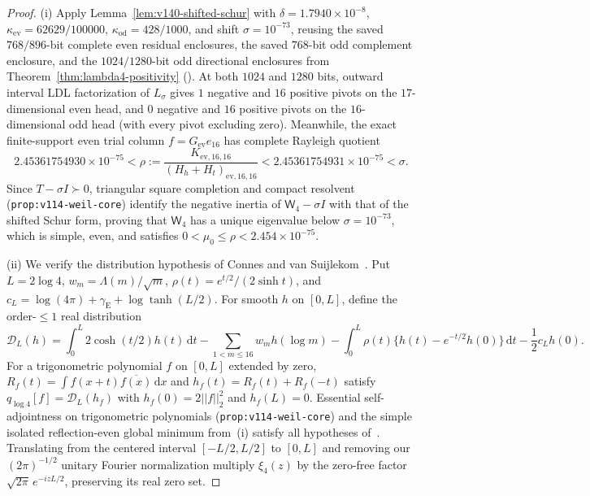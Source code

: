\documentclass[11pt]{article}
\def\norm#1{||#1||}%
\theoremstyle{remark}
\newcommand{\norm}[1]{\left\lVert #1\right\rVert}
\newcommand{\dd}{\mathrm d}
\begin{document}
\begin{proof}
(i) Apply Lemma~\ref{lem:v140-shifted-schur} with $\delta = 1.7940 \times 10^{-8}$, $\kappa_{\mathrm{ev}} = 62629/100000$, $\kappa_{\mathrm{od}} = 428/1000$, and shift $\sigma = 10^{-73}$, reusing the saved $768/896$-bit complete even residual enclosures, the saved $768$-bit odd complement enclosure, and the $1024/1280$-bit odd directional enclosures from Theorem~\ref{thm:lambda4-positivity} (). At both $1024$ and $1280$ bits, outward interval LDL factorization of $L_\sigma$ gives $1$ negative and $16$ positive pivots on the $17$-dimensional even head, and $0$ negative and $16$ positive pivots on the $16$-dimensional odd head (with every pivot excluding zero). Meanwhile, the exact finite-support even trial column $f = G_{\mathrm{ev}} e_{16}$ has complete Rayleigh quotient
\begin{equation}\label{eq:v140-rayleigh-e16}
  2.45361754930 \times 10^{-75} < \rho := \frac{K_{\mathrm{ev},16,16}}{(H_h + H_t)_{\mathrm{ev},16,16}} < 2.45361754931 \times 10^{-75} < \sigma.
\end{equation}
Since $T - \sigma I \succ 0$, triangular square completion and compact resolvent (\texttt{prop:v114-weil-core}) identify the negative inertia of $\mathsf{W}_4 - \sigma I$ with that of the shifted Schur form, proving that $\mathsf{W}_4$ has a unique eigenvalue below $\sigma = 10^{-73}$, which is simple, even, and satisfies $0 < \mu_0 \le \rho < 2.454 \times 10^{-75}$.

(ii) We verify the distribution hypothesis of Connes and van Suijlekom~\cite[Theorem~6.1 and Remark~4.3]{ConnesVanSuijlekom2025}. Put $L = 2\log 4$, $w_m = \Lambda(m)/\sqrt{m}$, $\rho(t) = e^{t/2}/(2\sinh t)$, and $c_L = \log(4\pi) + \gamma_{\mathrm{E}} + \log\tanh(L/2)$. For smooth $h$ on $[0,L]$, define the order-$\le 1$ real distribution
\[
  \mathcal{D}_L(h) = \int_0^L 2\cosh(t/2)h(t)\,\dd t - \sum_{1 < m \le 16} w_m h(\log m) - \int_0^L \rho(t)\bigl\{h(t) - e^{-t/2}h(0)\bigr\}\,\dd t - \frac{1}{2}c_L h(0).
\]
For a trigonometric polynomial $f$ on $[0,L]$ extended by zero, $R_f(t) = \int f(x+t)\overline{f(x)}\,\dd x$ and $h_f(t) = R_f(t) + R_f(-t)$ satisfy $q_{\log 4}[f] = \mathcal{D}_L(h_f)$ with $h_f(0) = 2\norm{f}_2^2$ and $h_f(L) = 0$. Essential self-adjointness on trigonometric polynomials (\texttt{prop:v114-weil-core}) and the simple isolated reflection-even global minimum from~(i) satisfy all hypotheses of~\cite[Theorem~6.1]{ConnesVanSuijlekom2025}. Translating from the centered interval $[-L/2, L/2]$ to $[0,L]$ and removing our $(2\pi)^{-1/2}$ unitary Fourier normalization multiply $\widehat{\xi}_4(z)$ by the zero-free factor $\sqrt{2\pi}\,e^{-izL/2}$, preserving its real zero set.
\end{proof}
\end{document}
